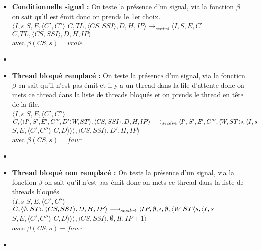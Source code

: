 \documentclass[10pt,a4paper]{article}
\begin{document}
\begin{enumerate}
\begin{itemize}
			    	\item[] \textbf{Conditionnelle signal :} On teste la présence d'un signal, via la fonction $\beta$ on sait qu'il est émit donc on prends le 1er choix.
			    	\\ $\langle I,s$ $S,E,\langle C',C''\rangle$ $C,TL,\langle CS,SSI\rangle,D,H,IP\rangle 
			    	\longrightarrow_{secdv4} \langle I,S,E,C'$ $C,TL,\langle CS,SSI\rangle,D,H,IP\rangle$ \\
			    	avec $\beta(CS,s) = vraie$
			    	\item[]
			    	
			    	
			    	\item[] \textbf{ Thread bloqué remplacé :} On teste la présence d'un signal, via la fonction $\beta$ on sait qu'il n'est pas émit et il y a un thread dans la file d'attente
			    	donc on mets ce thread dans la liste de threads bloqués et on prends le thread en tête de la file.
			    	\\$\langle I,s$ $S,E,\langle C',C''\rangle$ $C,\langle\langle I',S',E',C''',D'\rangle W,ST\rangle,\langle CS,SSI\rangle,D,H,IP\rangle 
			    	\\\longrightarrow_{secdv4} \langle I',S',E',C''',\langle W,ST\langle s,\langle I,s$ $S,E,\langle C',C''\rangle$ $C,D\rangle\rangle\rangle,\langle CS,SSI\rangle,D',H,IP\rangle$ \\
			    	avec $\beta(CS,s) = faux$
			    	\item[]	
			    	
			    	\item[] \textbf{Thread bloqué non remplacé :} On teste la présence d'un signal, via la fonction $\beta$ on sait qu'il n'est pas émit donc on mets ce thread dans la liste de threads bloqués.
			    	\\ $\langle I,s$ $S,E,\langle C',C''\rangle$ $C,\langle \emptyset,ST\rangle,\langle CS,SSI\rangle,D,H,IP\rangle 
			    	\\\longrightarrow_{secdv4} \langle IP,\emptyset,\epsilon,\emptyset,\langle W,ST\langle s,\langle I,s$ $S,E,\langle C',C''\rangle$ $C,D\rangle\rangle\rangle,\langle CS,SSI\rangle,\emptyset,H,IP+1\rangle$ \\
			    	avec $\beta(CS,s) = faux$
			    	\item[]	
			    	

\end{itemize}
\end{enumerate}
\end{document}
